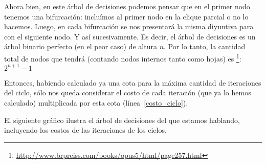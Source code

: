 \par Ahora bien, en este \'arbol de decisiones podemos pensar que en el primer nodo
    tenemos una bifurcaci\'on: inclu\'imos al primer nodo en la clique parcial o
    no lo hacemos. Luego, en cada bifurcaci\'on se nos presentar\'a la misma
    diyuntiva para con el siguiente nodo. Y as\'i sucesivamente. Es decir, el
    \'arbol de decisiones es un \'arbol binario perfecto (en el peor caso) de
    altura $n$. Por lo tanto, la cantidad total de nodos que tendr\'a
    (contando nodos internos tanto como hojas) es%
    \footnote{\url{http://www.brpreiss.com/books/opus5/html/page257.html}}:
    $2^{n+1}-1$

\bigskip
\par Entonces, habiendo calculado ya una cota para la m\'axima cantidad de iteraciones
    del ciclo, s\'olo nos queda considerar el costo de cada iteraci\'on (que ya
    lo hemos calculado) multiplicada por esta cota (l\'inea~\ref{costo_ciclo}).

\par El siguiente gr\'afico ilustra el \'arbol de decisiones del que estamos hablando,
    incluyendo los costos de las iteraciones de los ciclos.

